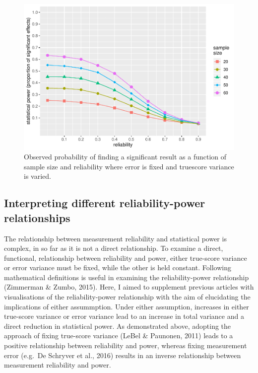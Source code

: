 \documentclass[english,,man]{apa6}
\begin{document}
\begin{figure}[H]
\includegraphics{visualising-reliability-and-power-relationships-v2_files/figure-latex/plotting4-1} \caption{Observed probability of finding a significant result as a function of sample size and reliability where error is fixed and truescore variance is varied.}\label{fig:plotting4}
\end{figure}

\hypertarget{interpreting-different-reliability-power-relationships}{%
\subsection{Interpreting different reliability-power relationships}\label{interpreting-different-reliability-power-relationships}}

The relationship between measurement reliability and statistical power is complex, in so far as it is not a direct relationship. To examine a direct, functional, relationship between reliability and power, either true-score variance or error variance must be fixed, while the other is held constant. Following mathematical definitions is useful in examining the reliability-power relationship (Zimmerman \& Zumbo, 2015). Here, I aimed to supplement previous articles with visualisations of the reliability-power relationship with the aim of elucidating the implications of either assummption. Under either assumption, increases in either true-score variance or error variance lead to an increase in total variance and a direct reduction in statistical power. As demonstrated above, adopting the approach of fixing true-score variance (LeBel \& Paunonen, 2011) leads to a positive relationship between reliability and power, whereas fixing measurement error (e.g.~De Schryver et al., 2016) results in an inverse relationship between measurement reliability and power.
\end{document}
